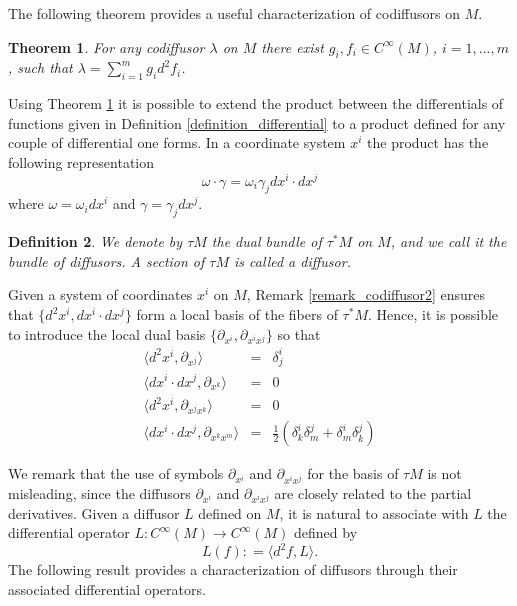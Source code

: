 \documentclass{article}[10pt]
\newtheorem{theorem}{Theorem}[section]
\newtheorem{definition}[theorem]{Definition}
\newcommand{\cinf}[0]{C^{\infty}}
\begin{document}
The following theorem provides a useful  characterization of codiffusors on $M$.
\begin{theorem}\label{theorem_codiffusor1}
For any codiffusor $\lambda$ on $M$ there exist $g_i,f_i \in \cinf(M)$, $i=1,...,m$, such that
$\lambda=\sum_{i=1}^{m}g_id^2f_i$.
\end{theorem}


Using Theorem \ref{theorem_codiffusor1} it is possible to extend the product between the differentials of functions given in Definition
\ref{definition_differential} to a product defined for any couple of differential one forms. In a coordinate system $x^i$ the product has
the following representation
$$\omega \cdot \gamma =\omega_i \gamma_j dx^i \cdot dx^j$$
where $\omega= \omega_i dx^i$ and $\gamma=\gamma_j dx^j$.

\begin{definition}
We denote by  $ \tau M $ the dual bundle of $ \tau ^ *  M $ on $M$, and we call it   the \emph{bundle of diffusors}. A
section of $ \tau  M$ is called a \emph{diffusor}.
\end{definition}

Given  a system of coordinates $ x ^ i $ on $ M $, Remark \ref{remark_codiffusor2} ensures that $\{ d ^ 2x ^ i, dx ^ i \cdot dx ^ j \}$ form a
local basis of the fibers of $ \tau ^ * M $. Hence, it is possible to introduce  the local dual basis $\{ \partial_{x^ i}, \partial_{x^ ix ^ j}
\}$ so that
\begin{eqnarray*}
\langle d^2x^i,\partial_{x^j} \rangle &= &\delta^i_j\\
\langle dx^i \cdot dx^j, \partial_{x^k}\rangle &=& 0\\
\langle d^2x^i , \partial_{x^jx^k} \rangle &=&0\\
\langle dx^i \cdot dx^j, \partial_{x^kx^m} \rangle &=& \frac{1}{2}(\delta^i_k\delta^j_m+\delta^i_m \delta^j_k)
\end{eqnarray*}

We remark that the use of symbols $\partial_{x^i}$ and $\partial_{x^ix^j}$ for the basis of $\tau M$ is not misleading, since  the diffusors $\partial_{x^i}$ and $\partial_{x^ix^j}$ are closely related to  the partial derivatives.
Given  a diffusor $ L $ defined on $ M $, it is natural to associate with $L$  the differential operator $ L: \cinf (M) \rightarrow \cinf(M) $ defined by
\begin{equation}
L (f): = \langle d ^ 2f, L \rangle.
\end{equation}
The following result provides a characterization of diffusors through their associated differential operators.
\end{document}
